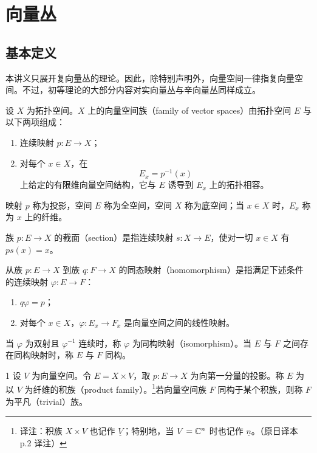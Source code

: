 \chapter{向量丛}
\section{基本定义}

本讲义只展开复向量丛的理论。因此，除特别声明外，向量空间一律指复向量空间。不过，初等理论的大部分内容对实向量丛与辛向量丛同样成立。

设 $X$ 为拓扑空间。$X$ 上的向量空间族（family of vector spaces）由拓扑空间 $E$ 与以下两项组成：

\begin{enumerate}[label=(\roman*),leftmargin=2.4em,itemsep=2pt]
\item 连续映射 $p\colon E\to X$；
\item 对每个 $x\in X$，在
\[
E_x=p^{-1}(x)
\]
上给定的有限维向量空间结构，它与 $E$ 诱导到 $E_x$ 上的拓扑相容。
\end{enumerate}

映射 $p$ 称为投影，空间 $E$ 称为全空间，空间 $X$ 称为底空间；当 $x\in X$ 时，$E_x$ 称为 $x$ 上的纤维。

族 $p\colon E\to X$ 的截面（section）是指连续映射 $s\colon X\to E$，使对一切 $x\in X$ 有 $ps(x)=x$。

从族 $p\colon E\to X$ 到族 $q\colon F\to X$ 的同态映射（homomorphism）是指满足下述条件的连续映射 $\varphi\colon E\to F$：

\begin{enumerate}[label=(\roman*),leftmargin=2.4em,itemsep=2pt]
\item $q\varphi=p$；
\item 对每个 $x\in X$，$\varphi\colon E_x\to F_x$ 是向量空间之间的线性映射。
\end{enumerate}

当 $\varphi$ 为双射且 $\varphi^{-1}$ 连续时，称 $\varphi$ 为同构映射（isomorphism）。当 $E$ 与 $F$ 之间存在同构映射时，称 $E$ 与 $F$ 同构。

\begin{example*}{1}
  设 $V$ 为向量空间。令 $E=X\times V$，取 $p\colon E\to X$ 为向第一分量的投影。称 $E$ 为以 $V$ 为纤维的积族（product family）。\footnote{译注：积族 $X\times V$ 也记作 $\underline{V}$；特别地，当 $V=\mathbb{C}^n$ 时也记作 $\underline{n}$。（原日译本 p.2 译注）}若向量空间族 $F$ 同构于某个积族，则称 $F$ 为平凡（trivial）族。
\end{example*}


